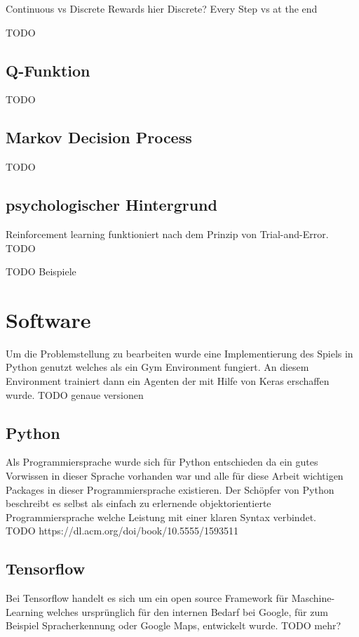 \colorbox{red!30}{Continuous vs Discrete Rewards} hier Discrete? \colorbox{red!30}{Every Step vs at the end}

\colorbox{red!30}{TODO} %

\subsection{Q-Funktion}
\colorbox{red!30}{TODO} %

\subsection{Markov Decision Process}
\colorbox{red!30}{TODO} %

\subsection{psychologischer Hintergrund}
Reinforcement learning funktioniert nach dem Prinzip von Trial-and-Error.\\
\colorbox{red!30}{TODO} %



\colorbox{red!30}{TODO Beispiele} %






\section{Software}
Um die Problemstellung zu bearbeiten wurde eine Implementierung des Spiels in Python genutzt welches als ein Gym Environment fungiert. An diesem Environment trainiert dann ein Agenten der mit Hilfe von  Keras erschaffen wurde.
\colorbox{red!30}{TODO genaue versionen}

\subsection{Python}
Als Programmiersprache wurde sich für Python entschieden da ein gutes Vorwissen in dieser Sprache vorhanden war und alle für diese Arbeit wichtigen Packages in dieser Programmiersprache existieren.
Der Schöpfer von Python beschreibt es selbst als einfach zu erlernende objektorientierte Programmiersprache welche Leistung mit einer klaren Syntax verbindet.\\
\colorbox{red!30}{TODO https://dl.acm.org/doi/book/10.5555/1593511}

\subsection{Tensorflow}
Bei Tensorflow handelt es sich um ein open source Framework für Maschine-Learning welches ursprünglich für den internen Bedarf bei Google, für zum Beispiel Spracherkennung oder Google Maps, entwickelt wurde. 
\colorbox{red!30}{TODO mehr?}

